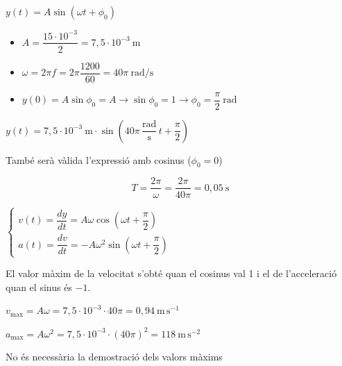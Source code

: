 \begin{solapartat}
 $y(t) = A\sin(\omega t + \phi_0)$

\begin{itemize}[leftmargin=2em, label={}]
  \item {} $A = \dfrac{15\cdot 10^{-3}}{2} = 7,5\cdot 10^{-3}\ \mathrm{m}$
  \item {} $\omega = 2\pi f = 2\pi\dfrac{1200}{60} = 40\pi\ \mathrm{rad/s}$
  \item {} $y(0) = A\sin\phi_0 = A \rightarrow \sin\phi_0 = 1 \rightarrow \phi_0 = \dfrac{\pi}{2}\ \mathrm{rad}$
\end{itemize}

 $y(t) = 7,5\cdot 10^{-3}\ \mathrm{m}\cdot\sin\left(40\pi\,\dfrac{\mathrm{rad}}{\mathrm{s}}\,t + \dfrac{\pi}{2}\right)$

També serà vàlida l'expressió amb cosinus ($\phi_0 = 0$)



\[ T = \frac{2\pi}{\omega} = \frac{2\pi}{40\pi} = 0,05\ \mathrm{s} \]
\end{solapartat}

\begin{solapartat}
 $\left\{\begin{array}{l}
v(t) = \dfrac{dy}{dt} = A\omega\cos\left(\omega t + \dfrac{\pi}{2}\right)\\[2ex]
a(t) = \dfrac{dv}{dt} = -A\omega^2\sin\left(\omega t + \dfrac{\pi}{2}\right)
\end{array}\right.$

El valor màxim de la velocitat s'obté quan el cosinus val 1 i el de l'acceleració quan el sinus és $-1$.

 $v_\mathrm{max} = A\omega = 7,5\cdot 10^{-3}\cdot 40\pi = 0,94\ \mathrm{m\,s^{-1}}$

 $a_\mathrm{max} = A\omega^2 = 7,5\cdot 10^{-3}\cdot (40\pi)^2 = 118\ \mathrm{m\,s^{-2}}$

No és necessària la demostració dels valors màxims
\end{solapartat}
